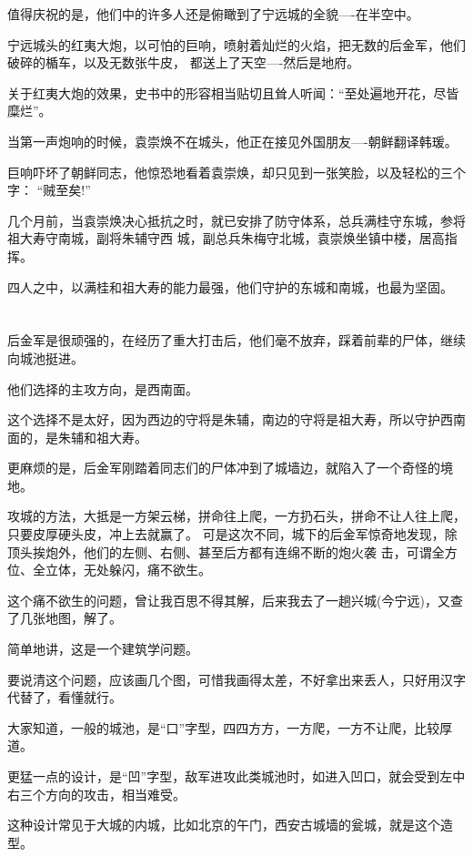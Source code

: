 \documentclass[11pt,a4paper,onecolumn]{article}
\begin{document}
值得庆祝的是，他们中的许多人还是俯瞰到了宁远城的全貌----在半空中。

宁远城头的红夷大炮，以可怕的巨响，喷射着灿烂的火焰，把无数的后金军，他们破碎的楯车，以及无数张牛皮，
都送上了天空----然后是地府。

关于红夷大炮的效果，史书中的形容相当贴切且耸人听闻：``至处遍地开花，尽皆糜烂''。

当第一声炮响的时候，袁崇焕不在城头，他正在接见外国朋友----朝鲜翻译韩瑗。

巨响吓坏了朝鲜同志，他惊恐地看着袁崇焕，却只见到一张笑脸，以及轻松的三个字： ``贼至矣!''

几个月前，当袁崇焕决心抵抗之时，就已安排了防守体系，总兵满桂守东城，参将祖大寿守南城，副将朱辅守西
城，副总兵朱梅守北城，袁崇焕坐镇中楼，居高指挥。

四人之中，以满桂和祖大寿的能力最强，他们守护的东城和南城，也最为坚固。

\section[\thesection]{}

后金军是很顽强的，在经历了重大打击后，他们毫不放弃，踩着前辈的尸体，继续向城池挺进。

他们选择的主攻方向，是西南面。

这个选择不是太好，因为西边的守将是朱辅，南边的守将是祖大寿，所以守护西南面的，是朱辅和祖大寿。

更麻烦的是，后金军刚踏着同志们的尸体冲到了城墙边，就陷入了一个奇怪的境地。

攻城的方法，大抵是一方架云梯，拼命往上爬，一方扔石头，拼命不让人往上爬，只要皮厚硬头皮，冲上去就赢了。
可是这次不同，城下的后金军惊奇地发现，除顶头挨炮外，他们的左侧、右侧、甚至后方都有连绵不断的炮火袭
击，可谓全方位、全立体，无处躲闪，痛不欲生。

这个痛不欲生的问题，曾让我百思不得其解，后来我去了一趟兴城(今宁远)，又查了几张地图，解了。

简单地讲，这是一个建筑学问题。

要说清这个问题，应该画几个图，可惜我画得太差，不好拿出来丢人，只好用汉字代替了，看懂就行。

大家知道，一般的城池，是``口''字型，四四方方，一方爬，一方不让爬，比较厚道。

更猛一点的设计，是``凹''字型，敌军进攻此类城池时，如进入凹口，就会受到左中右三个方向的攻击，相当难受。

这种设计常见于大城的内城，比如北京的午门，西安古城墙的瓮城，就是这个造型。
\end{document}
